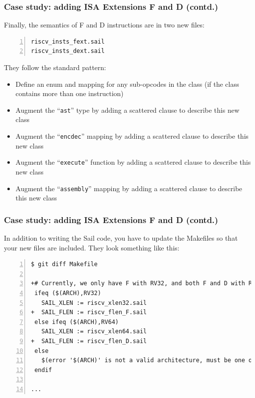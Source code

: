 \documentclass[aspectratio=169]{beamer}
\newcommand{\slidefont}{\scriptsize}
\newcommand{\cf}{\scriptsize\tt}
\begin{document}

\begin{frame}[fragile]
  \frametitle{Case study: adding ISA Extensions F and D (contd.)}

  \slidefont

  Finally, the semantics of F and D instructions are in two new files:

  \vspace{1ex}

  \begin{Verbatim}[frame=single, numbers=left, label = In your riscv-compliance repository clone]
riscv_insts_fext.sail
riscv_insts_dext.sail
  \end{Verbatim}

  They follow the standard pattern:
  \begin{itemize}
    \item Define an enum and mapping for any sub-opcodes in the class
      (if the class contains more than one instruction)
    \item Augment the ``{\cf ast}'' type by adding a scattered clause to describe this new class
    \item Augment the ``{\cf encdec}'' mapping by adding a scattered clause to describe this new class
    \item Augment the ``{\cf execute}'' function by adding a scattered clause to describe this new class
    \item Augment the ``{\cf assembly}'' mapping by adding a scattered clause to describe this new class
  \end{itemize}

\end{frame}


\begin{frame}[fragile]
  \frametitle{Case study: adding ISA Extensions F and D (contd.)}

  \slidefont

  In addition to writing the Sail code, you have to update the
  Makefiles so that your new files are included.  They look something like this:

  \vspace{1ex}

  \begin{Verbatim}[frame=single, numbers=left, label = In your riscv-compliance repository clone]
$ git diff Makefile

+# Currently, we only have F with RV32, and both F and D with RV64.
 ifeq ($(ARCH),RV32)
   SAIL_XLEN := riscv_xlen32.sail
+  SAIL_FLEN := riscv_flen_F.sail
 else ifeq ($(ARCH),RV64)
   SAIL_XLEN := riscv_xlen64.sail
+  SAIL_FLEN := riscv_flen_D.sail
 else
   $(error '$(ARCH)' is not a valid architecture, must be one of: RV32, RV64)
 endif

...
  \end{Verbatim}

\end{frame}
\end{document}
